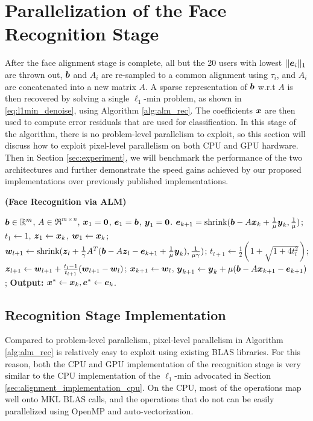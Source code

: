 \documentclass[10pt,twocolumn,letterpaper]{article}
\begin{document}
\section{Parallelization of the Face Recognition Stage}
\label{sec:recognition}
After the face alignment stage is complete, all but the 20 users with lowest
$||\boldsymbol{e}_i||_1$ are thrown out, ${\boldsymbol{b}}$ and $A_i$ are re-sampled to a common alignment
using $\tau_i$, and $A_i$ are concatenated into a new matrix $A$.
A sparse representation of ${\boldsymbol{b}}$ w.r.t $A$ is then recovered
by solving a single $\ell_1$-min problem, as shown
in \eqref{eq:l1min_denoise}, using Algorithm \ref{alg:alm_rec}.  The
coefficients ${\boldsymbol{x}}$ are then used to compute error residuals that are used for
classification.  
In this stage of the algorithm, there is no problem-level
parallelism to exploit, so this section will discuss how to exploit pixel-level parallelism
on both CPU and GPU hardware.
Then in Section \ref{sec:experiment}, we will benchmark the
performance of the two architectures and further demonstrate the speed
gains achieved by our proposed implementations over previously published implementations.

\begin{algorithm}[t]
\caption{\bf (Face Recognition via ALM)} \label{alg:alm_rec} 
\begin{algorithmic}[1]
\begin{small}
 ${\boldsymbol{b}} \in {\mathbb{R}}^m$, $A \in \Re^{m \times n}$,
${\boldsymbol{x}}_1 = \boldsymbol{0}$, $\boldsymbol{e}_1 = {\boldsymbol{b}}$, $\boldsymbol{y}_1 =
\boldsymbol{0}$.
\STATE $\boldsymbol{e}_{k+1} = \textup{shrink}({\boldsymbol{b}} - A{\boldsymbol{x}}_k +
\frac{1}{\mu}\boldsymbol{y}_k, \frac{1}{\mu})$;
\STATE $t_1\leftarrow 1$, $\boldsymbol{z}_1 \leftarrow {\boldsymbol{x}}_k$, $\boldsymbol{w}_1 \leftarrow {\boldsymbol{x}}_k$;
\STATE $\boldsymbol{w}_{l+1} \leftarrow \textup{shrink}(\boldsymbol{z}_l +
\frac{1}{\gamma}A^T({\boldsymbol{b}} - A\boldsymbol{z}_l - \boldsymbol{e}_{k+1} +
\frac{1}{\mu}\boldsymbol{y}_k), \frac{1}{\mu\gamma})$;
\STATE $t_{l+1} \leftarrow \frac{1}{2}( 1 +
\sqrt{1+4t_l^2})$;
\STATE $\boldsymbol{z}_{l+1} \leftarrow \boldsymbol{w}_{l+1} + \frac{t_l - 1}{t_{l+1}}(\boldsymbol{w}_{l+1} - \boldsymbol{w}_l)$;
\ENDWHILE
\STATE ${\boldsymbol{x}}_{k+1} \leftarrow \boldsymbol{w}_{l}$,  \; $\boldsymbol{y}_{k+1} \leftarrow \boldsymbol{y}_k + \mu ({\boldsymbol{b}} - A{\boldsymbol{x}}_{k+1} - \boldsymbol{e}_{k+1})$;
\ENDWHILE \STATE
{\bf Output:} ${\boldsymbol{x}}^* \leftarrow {\boldsymbol{x}}_k, \boldsymbol{e}^* \leftarrow \boldsymbol{e}_k$.
\end{small}
\end{algorithmic}
\end{algorithm}

\subsection{Recognition Stage Implementation} Compared to problem-level
parallelism, pixel-level parallelism in Algorithm \ref{alg:alm_rec} is
relatively easy to exploit using existing BLAS libraries.  For this reason,
both the CPU and GPU implementation of the recognition stage is very similar to
the CPU implementation of the $\ell_1$-min advocated in Section
\ref{sec:alignment_implementation_cpu}.  On the CPU, most of the operations map
well onto MKL BLAS calls, and the operations that do not can be easily
parallelized using OpenMP and auto-vectorization.
\end{document}
